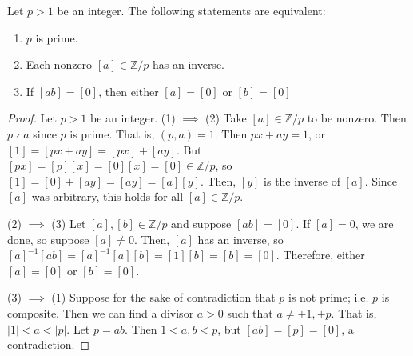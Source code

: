 \documentclass [12pt] {article}
\newcommand{\Z}{\mathbb{Z}}
\newenvironment{theorem}[1]{\begin{tcolorbox}[title={Theorem #1},colback=green!5!white,colframe=black!75!green]}{\end{tcolorbox}}
\begin{document}
\begin{theorem}{}
    Let $p > 1$ be an integer. The following statements are equivalent:
    \begin{enumerate}[label=(\arabic*)]
        \item $p$ is prime.
        \item Each nonzero $[a] \in \Z/p$ has an inverse.
        \item If $[ab] = [0]$, then either $[a] = [0]$ or $[b] = [0]$
    \end{enumerate}
\end{theorem}
\begin{proof}
    Let $p > 1$ be an integer.
    \newline
    (1) $\implies$ (2)
    Take $[a] \in \Z/p$ to be nonzero. Then $p \nmid a$ since $p$ is prime. That is, $(p, a) = 1$.
    Then $px + ay = 1$, or 
    $[1] = [px + ay]  = [px] + [ay]$. But $[px] = [p][x] = [0][x] = [0] \in \Z/p$, so 
    $[1] = [0] + [ay] = [ay] = [a][y]$. Then, $[y]$ is the inverse of $[a]$. Since $[a]$ was
    arbitrary, this holds for all $[a] \in \Z/p$.
    \vspace{0.5em}

    (2) $\implies$ (3)
    Let $[a], [b] \in \Z/p$ and suppose $[ab] = [0]$. If $[a] = 0$, we are done, so suppose 
    $[a] \neq 0$. Then, $[a]$ has an inverse, so 
    $[a]^{-1} [ab] = [a]^{-1}[a] [b] = [1][b] = [b] = [0]$. Therefore, either $[a] = [0]$ or 
    $[b] = [0]$.
    \vspace{0.5em}

    (3) $\implies$ (1)
    Suppose for the sake of contradiction that $p$ is not prime; i.e. $p$ is composite. Then we can
    find a divisor $a > 0$ such that $a \neq \pm 1, \pm p$. That is, $|1| < a < |p|$. Let $p = ab$.
    Then $1 < a, b < p$, but $[ab] = [p] = [0]$, a contradiction.
\end{proof}
\end{document}
